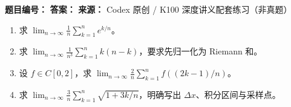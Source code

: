 \begin{problemBox}
\begin{problemMeta}
\textbf{题目编号：}  \quad
\textbf{答案：}  \quad
\textbf{来源：} Codex 原创 / K100 深度讲义配套练习（非真题）
\end{problemMeta}
\begin{enumerate}
  \item[\textbf{A}] 求 \(\lim_{n\to\infty}\frac1n\sum_{k=1}^n e^{k/n}\)。
  \item[\textbf{B}] 求 \(\lim_{n\to\infty}\frac1{n^3}\sum_{k=1}^nk(n-k)\)，要求先归一化为 Riemann 和。
  \item[\textbf{C}] 设 \(f\in C[0,2]\)，求 \(\lim_{n\to\infty}\frac2n\sum_{k=1}^nf((2k-1)/n)\)。
  \item[\textbf{M}] 求 \(\lim_{n\to\infty}\frac3n\sum_{k=1}^n\sqrt{1+3k/n}\)，明确写出 \(\Delta x\)、积分区间与采样点。
\end{enumerate}
\end{problemBox}
